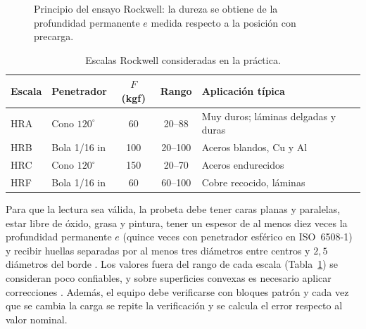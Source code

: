 \documentclass[journal,11pt]{IEEEtran}
\begin{document}
\begin{figure}[!t]
\centering
{}
\caption{Principio del ensayo Rockwell: la dureza se obtiene de la profundidad permanente $e$ medida respecto a la posición con precarga.}
\label{fig:principio}
\end{figure}

\begin{table}[!t]
\caption{Escalas Rockwell consideradas en la práctica.}
\label{tab:escalas}
\centering\footnotesize
\begin{tabular}{@{}llcc>{\raggedright\arraybackslash}p{2.2cm}@{}}
\toprule
Escala & Penetrador & $F$ (kgf) & Rango & Aplicación típica\\
\midrule
HRA & Cono $120^{\circ}$ & 60 & 20--88 & Muy duros; láminas delgadas y duras\\
HRB & Bola 1/16 in & 100 & 20--100 & Aceros blandos, Cu y Al\\
HRC & Cono $120^{\circ}$ & 150 & 20--70 & Aceros endurecidos\\
HRF & Bola 1/16 in & 60 & 60--100 & Cobre recocido, láminas\\
\bottomrule
\end{tabular}
\end{table}

Para que la lectura sea válida, la probeta debe tener caras planas y paralelas, estar libre de óxido, grasa y pintura, tener un espesor de al menos diez veces la profundidad permanente $e$ (quince veces con penetrador esférico en ISO~6508-1) y recibir huellas separadas por al menos tres diámetros entre centros y $2{,}5$ diámetros del borde \cite{astm18,iso6508}. Los valores fuera del rango de cada escala (Tabla~\ref{tab:escalas}) se consideran poco confiables, y sobre superficies convexas es necesario aplicar correcciones \cite{astm18}. Además, el equipo debe verificarse con bloques patrón y cada vez que se cambia la carga se repite la verificación y se calcula el error respecto al valor nominal.
\end{document}
